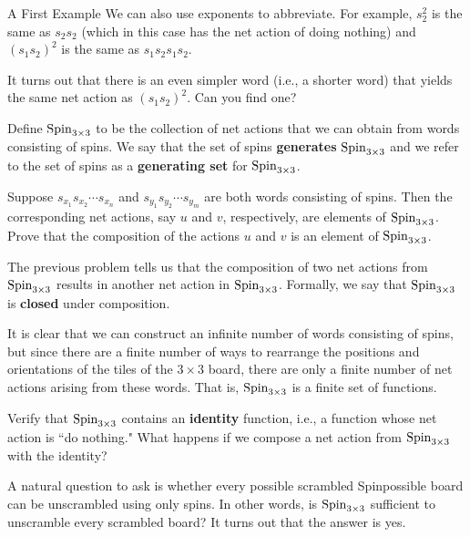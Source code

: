 \begin{section}{A First Example}
We can also use exponents to abbreviate.  For example, $s_2^2$ is the same as $s_2 s_2$ (which in this case has the net action of doing nothing) and $(s_1 s_2)^2$ is the same as $s_1 s_2 s_1 s_2$.

\begin{problem}\label{prob:braid_relation}
It turns out that there is an even simpler word (i.e., a shorter word) that yields the same net action as $(s_1 s_2)^2$. Can you find one?
\end{problem}

Define $\operatorname{Spin}_{3\times 3}$ to be the collection of net actions that we can obtain from words consisting of spins.  We say that the set of spins \textbf{generates} $\operatorname{Spin}_{3\times 3}$ and we refer to the set of spins as a \textbf{generating set} for $\operatorname{Spin}_{3\times 3}$.  

\begin{problem}
Suppose $s_{x_1}s_{x_2}\cdots s_{x_n}$ and $s_{y_1}s_{y_2}\cdots s_{y_m}$ are both words consisting of spins. Then the corresponding net actions, say $u$ and $v$, respectively, are elements of $\operatorname{Spin}_{3\times 3}$. Prove that the composition of the actions $u$ and $v$ is an element of $\operatorname{Spin}_{3\times 3}$.
\end{problem}

The previous problem tells us that the composition of two net actions from $\operatorname{Spin}_{3\times 3}$ results in another net action in $\operatorname{Spin}_{3\times 3}$. Formally, we say that $\operatorname{Spin}_{3\times 3}$ is \textbf{closed} under composition.

It is clear that we can construct an infinite number of words consisting of spins, but since there are a finite number of ways to rearrange the positions and orientations of the tiles of the $3\times 3$ board, there are only a finite number of net actions arising from these words.  That is, $\operatorname{Spin}_{3\times 3}$ is a finite set of functions.

\begin{problem}
Verify that $\operatorname{Spin}_{3\times 3}$ contains an \textbf{identity} function, i.e., a function whose net action is ``do nothing." What happens if we compose a net action from $\operatorname{Spin}_{3\times 3}$ with the identity?
\end{problem}

A natural question to ask is whether every possible scrambled Spinpossible board can be unscrambled using only spins.  In other words, is $\operatorname{Spin}_{3\times 3}$ sufficient to unscramble every scrambled board? It turns out that the answer is yes.


\end{section}
